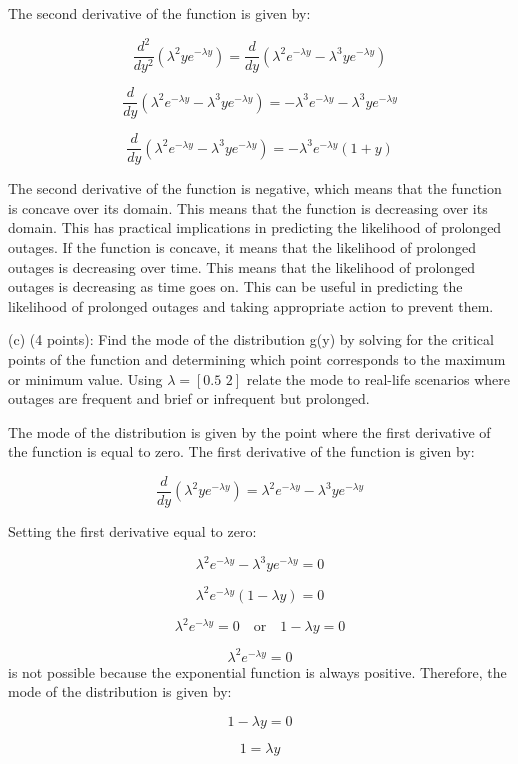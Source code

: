 \documentclass{article}
\begin{document}
The second derivative of the function is given by:

\[\frac{d^2}{dy^2}(\lambda^2ye^{-\lambda y}) = \frac{d}{dy}(\lambda^2e^{-\lambda y} - \lambda^3ye^{-\lambda y})\]

\[\frac{d}{dy}(\lambda^2e^{-\lambda y} - \lambda^3ye^{-\lambda y}) = -\lambda^3e^{-\lambda y} - \lambda^3ye^{-\lambda y}\]

\[\frac{d}{dy}(\lambda^2e^{-\lambda y} - \lambda^3ye^{-\lambda y}) = -\lambda^3e^{-\lambda y}(1 + y)\]



The second derivative of the function is negative, which means that the function is concave over its domain. This means that the function is decreasing over its domain. This has practical implications in predicting the likelihood of prolonged outages. If the function is concave, it means that the likelihood of prolonged outages is decreasing over time. This means that the likelihood of prolonged outages is decreasing as time goes on. This can be useful in predicting the likelihood of prolonged outages and taking appropriate action to prevent them.

(c) (4 points): Find the mode of the distribution g(y) by solving for the critical points of the
function and determining which point corresponds to the maximum or minimum value. Using \(\lambda = [\text{0.5 2}]\) relate the mode to real-life scenarios where outages are frequent and brief or infrequent but prolonged.\newline

The mode of the distribution is given by the point where the first derivative of the function is equal to zero. The first derivative of the function is given by:

\[\frac{d}{dy}(\lambda^2ye^{-\lambda y}) = \lambda^2e^{-\lambda y} - \lambda^3ye^{-\lambda y}\]

Setting the first derivative equal to zero:

\[\lambda^2e^{-\lambda y} - \lambda^3ye^{-\lambda y} = 0\]

\[\lambda^2e^{-\lambda y}(1 - \lambda y) = 0\]

\[\lambda^2e^{-\lambda y} = 0 \quad \text{or} \quad 1 - \lambda y = 0\]

\[\lambda^2e^{-\lambda y} = 0\] is not possible because the exponential function is always positive. Therefore, the mode of the distribution is given by:

\[1 - \lambda y = 0\]

\[1 = \lambda y\]
\end{document}
